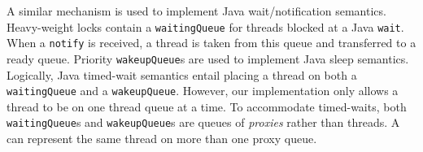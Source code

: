 A similar mechanism is used to implement Java wait/notification
semantics.  Heavy-weight locks contain a {\tt waitingQueue} for
threads blocked at a Java {\tt wait}.  When a {\tt notify} is
received, a thread is taken from this queue and transferred to a ready
queue.  Priority {\tt wakeupQueue}s are used to implement Java sleep
semantics.  Logically, Java timed-wait semantics entail placing a
thread on both a {\tt waitingQueue} and a {\tt wakeupQueue}.  However, our
implementation only allows a thread to be on one thread queue at
a time.  To accommodate timed-waits, both {\tt wai\-ting\-Queue}s and
{\tt wake\-up\-Queue}s are queues of {\em proxies} rather than threads.
A  can represent the same thread
on more than one proxy queue.
